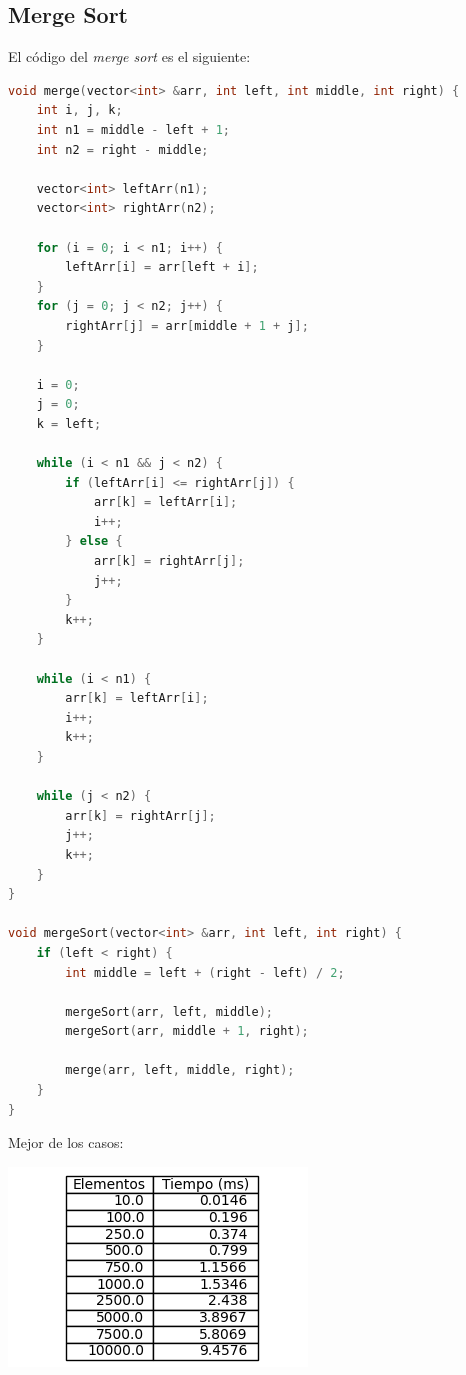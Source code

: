 \documentclass[14pt,a4paper]{report}
\begin{document}
\subsection*{Merge Sort}
\quad El código del \textit{merge sort} es el siguiente:
\begin{lstlisting}[language=C++]
void merge(vector<int> &arr, int left, int middle, int right) {
    int i, j, k;
    int n1 = middle - left + 1;
    int n2 = right - middle;

    vector<int> leftArr(n1);
    vector<int> rightArr(n2);

    for (i = 0; i < n1; i++) {
        leftArr[i] = arr[left + i];
    }
    for (j = 0; j < n2; j++) {
        rightArr[j] = arr[middle + 1 + j];
    }

    i = 0;
    j = 0;
    k = left;

    while (i < n1 && j < n2) {
        if (leftArr[i] <= rightArr[j]) {
            arr[k] = leftArr[i];
            i++;
        } else {
            arr[k] = rightArr[j];
            j++;
        }
        k++;
    }

    while (i < n1) {
        arr[k] = leftArr[i];
        i++;
        k++;
    }

    while (j < n2) {
        arr[k] = rightArr[j];
        j++;
        k++;
    }
}

void mergeSort(vector<int> &arr, int left, int right) {
    if (left < right) {
        int middle = left + (right - left) / 2;

        mergeSort(arr, left, middle);
        mergeSort(arr, middle + 1, right);

        merge(arr, left, middle, right);
    }
}
\end{lstlisting}
\newpage
Mejor de los casos:
\begin{center}
\includegraphics[scale=1]{../tabla-merge-best.png}  
\end{center}
\end{document}
